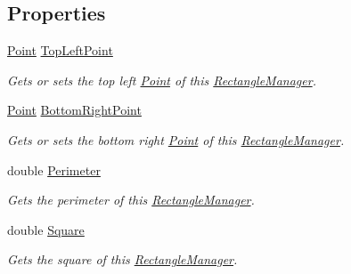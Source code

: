\subsection*{Properties}
\begin{DoxyCompactItemize}
\item 
\mbox{\hyperlink{class_test_project_1_1_task_library_1_1_tasks_1_1_lesson1_1_1_models_1_1_point}{Point}} \mbox{\hyperlink{class_test_project_1_1_task_library_1_1_tasks_1_1_lesson1_1_1_models_1_1_rectangle_manager_aac69836f426e37198aa03df6be6ee3f3}{Top\+Left\+Point}}
\begin{DoxyCompactList}\small\item\em Gets or sets the top left \mbox{\hyperlink{class_test_project_1_1_task_library_1_1_tasks_1_1_lesson1_1_1_models_1_1_point}{Point}} of this \mbox{\hyperlink{class_test_project_1_1_task_library_1_1_tasks_1_1_lesson1_1_1_models_1_1_rectangle_manager}{Rectangle\+Manager}}. \end{DoxyCompactList}\item 
\mbox{\hyperlink{class_test_project_1_1_task_library_1_1_tasks_1_1_lesson1_1_1_models_1_1_point}{Point}} \mbox{\hyperlink{class_test_project_1_1_task_library_1_1_tasks_1_1_lesson1_1_1_models_1_1_rectangle_manager_a30c9f322de50dcec6706938983d18095}{Bottom\+Right\+Point}}
\begin{DoxyCompactList}\small\item\em Gets or sets the bottom right \mbox{\hyperlink{class_test_project_1_1_task_library_1_1_tasks_1_1_lesson1_1_1_models_1_1_point}{Point}} of this \mbox{\hyperlink{class_test_project_1_1_task_library_1_1_tasks_1_1_lesson1_1_1_models_1_1_rectangle_manager}{Rectangle\+Manager}}. \end{DoxyCompactList}\item 
double \mbox{\hyperlink{class_test_project_1_1_task_library_1_1_tasks_1_1_lesson1_1_1_models_1_1_rectangle_manager_a7f20f8f46e672305ce1596ac5871d952}{Perimeter}}
\begin{DoxyCompactList}\small\item\em Gets the perimeter of this \mbox{\hyperlink{class_test_project_1_1_task_library_1_1_tasks_1_1_lesson1_1_1_models_1_1_rectangle_manager}{Rectangle\+Manager}}. \end{DoxyCompactList}\item 
double \mbox{\hyperlink{class_test_project_1_1_task_library_1_1_tasks_1_1_lesson1_1_1_models_1_1_rectangle_manager_a3db7d1e48dcf316b4fff9a442b5ae906}{Square}}
\begin{DoxyCompactList}\small\item\em Gets the square of this \mbox{\hyperlink{class_test_project_1_1_task_library_1_1_tasks_1_1_lesson1_1_1_models_1_1_rectangle_manager}{Rectangle\+Manager}}. \end{DoxyCompactList}\end{DoxyCompactItemize}


